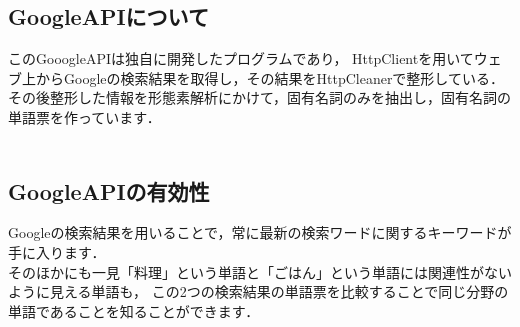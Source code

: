 \subsection{GoogleAPIについて}
このGooogleAPIは独自に開発したプログラムであり，
HttpClientを用いてウェブ上からGoogleの検索結果を取得し，その結果をHttpCleanerで整形している．\\
その後整形した情報を形態素解析にかけて，固有名詞のみを抽出し，固有名詞の単語票を作っています．\\
\\

\subsection{GoogleAPIの有効性}
Googleの検索結果を用いることで，常に最新の検索ワードに関するキーワードが手に入ります．
\\
そのほかにも一見「料理」という単語と「ごはん」という単語には関連性がないように見える単語も，
この2つの検索結果の単語票を比較することで同じ分野の単語であることを知ることができます．\\